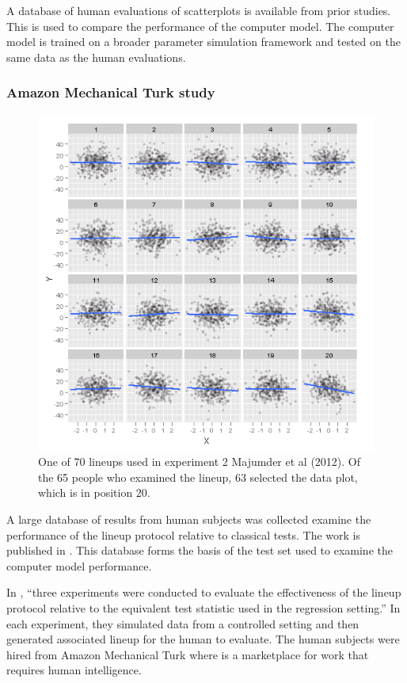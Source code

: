 \documentclass[12pt]{article}
\begin{document}
A database of human evaluations of scatterplots is available from prior
studies. This is used to compare the performance of the computer model.
The computer model is trained on a broader parameter simulation
framework and tested on the same data as the human evaluations.

\subsubsection{Amazon Mechanical Turk
study}\label{amazon-mechanical-turk-study}

\begin{figure}[h]
\centerline{\includegraphics[width=15cm]{figures/plot_turk2_300_350_12_3.png}}
\caption{One of 70 lineups used in experiment 2 Majumder et al (2012). Of the 65 people who examined the lineup,  63 selected the data plot, which is in position 20.}
\label{expt2}
\end{figure}

A large database of results from human subjects was collected examine
the performance of the lineup protocol relative to classical tests. The
work is published in \citet{MM13}. This database forms the basis of the
test set used to examine the computer model performance.

In \citet{MM13}, ``three experiments were conducted to evaluate the
effectiveness of the lineup protocol relative to the equivalent test
statistic used in the regression setting.'' In each experiment, they
simulated data from a controlled setting and then generated associated
lineup for the human to evaluate. The human subjects were hired from
Amazon Mechanical Turk where is a marketplace for work that requires
human intelligence. \citep{amazon}
\end{document}
